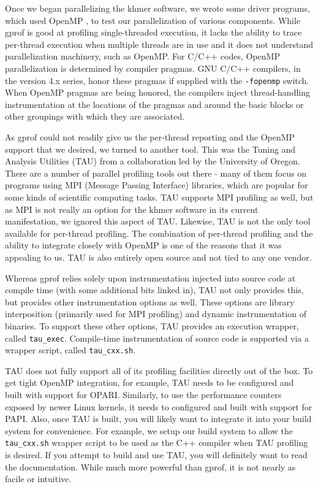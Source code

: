 \documentclass{article}
\begin{document}
Once we began parallelizing the khmer software, we wrote some driver programs,
which used OpenMP \citep{web:OpenMP}, to test our parallelization of various
components. While gprof is good at profiling single-threaded execution, it
lacks the ability to trace per-thread execution when multiple threads are in
use and it does not understand parallelization machinery, such as OpenMP. For
C/C++ codes, OpenMP parallelization is determined by compiler pragmas. GNU
C/C++ compilers, in the version 4.x series, honor these pragmas if supplied
with the \texttt{-fopenmp} switch. When OpenMP pragmas are being honored, the
compilers inject thread-handling instrumentation at the locations of the
pragmas and around the basic blocks or other groupings with which they are
associated.

As gprof could not readily give us the per-thread reporting and the OpenMP
support that we desired, we turned to another tool. This was the Tuning and
Analysis Utilities (TAU) \citep{web:TAU} from a collaboration led by the
University of Oregon. There are a number of parallel profiling tools out there
- many of them focus on programs using MPI (Message Passing Interface)
libraries, which are popular for some kinds of scientific computing tasks. TAU
supports MPI profiling as well, but as MPI is not really an option for the
khmer software in its current manifestation, we ignored this aspect of TAU.
Likewise, TAU is not the only tool available for per-thread profiling. The
combination of per-thread profiling and the ability to integrate closely with
OpenMP is one of the reasons that it was appealing to us. TAU is also entirely
open source and not tied to any one vendor.

Whereas gprof relies solely upon instrumentation injected into source code at
compile time (with some additional bits linked in), TAU not only provides this,
but provides other instrumentation options as well. These options are library
interposition (primarily used for MPI profiling) and dynamic instrumentation of
binaries. To support these other options, TAU provides an execution wrapper,
called \texttt{tau\_exec}. Compile-time instrumentation of source code is
supported via a wrapper script, called \texttt{tau\_cxx.sh}.

TAU does not fully support all of its profiling facilities directly out of the
box. To get tight OpenMP integration, for example, TAU needs to be configured
and built with support for OPARI. Similarly, to use the performance counters
exposed by newer Linux kernels, it needs to configured and built with support
for PAPI. Also, once TAU is built, you will likely want to integrate it into
your build system for convenience. For example, we setup our build system to
allow the \texttt{tau\_cxx.sh} wrapper script to be used as the C++ compiler
when TAU profiling is desired. If you attempt to build and use TAU, you will
definitely want to read the documentation. While much more powerful than gprof,
it is not nearly as facile or intuitive.
\end{document}

